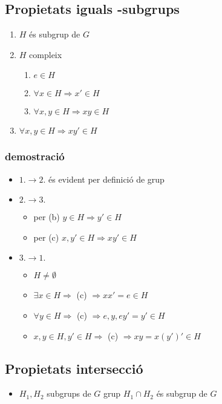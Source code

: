\documentclass{article}
\begin{document}
\subsection{Propietats iguals -subgrups}
\begin{enumerate}
\item $H$ és subgrup de $G$
\item $H$ compleix
	\begin{enumerate}
	\item $e \in H$
	\item $\forall x \in H \Rightarrow x' \in H$
	\item $\forall x, y \in H \Rightarrow xy \in H$
	\end{enumerate}
\item $\forall x, y \in H \Rightarrow xy' \in H$
\end{enumerate}
\subsubsection{demostració}
\begin{itemize}
\item $1. \to 2.$ és evident per definició de grup
\item $2. \to 3.$
	\begin{itemize}
	\item per (b) $y \in H \Rightarrow y' \in H$
	\item per (c) $x, y' \in H \Rightarrow xy' \in H$
	\end{itemize}
\item $3. \to 1.$
	\begin{itemize}
	\item $H \neq \emptyset$
	\item $\exists x \in H \Rightarrow$ (c) $\Rightarrow xx' = e \in H$
	\item $\forall y \in H \Rightarrow$ (c) $\Rightarrow e, y, ey' = y' \in H$
	\item $x, y \in H, y' \in H \Rightarrow$ (c) $\Rightarrow xy = x(y')' \in H$
	\end{itemize}
\end{itemize}
\subsection{Propietats intersecció}
\begin{itemize}
\item $H_1, H_2$ subgrups de $G$ grup
	\subitem $H_1 \cap H_2$ és subgrup de $G$
\end{itemize}
\end{document}
